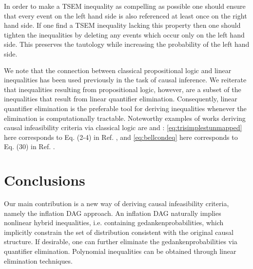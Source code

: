 In order to make a TSEM inequality as compelling as possible one should ensure that every event on the left hand side is also referenced at least once on the right hand side. If one find a TSEM inequality lacking this property then one should tighten the inequalities by deleting any events which occur only on the left hand side. This preserves the tautology while increasing the probability of the left hand side.

We note that the connection between classical propositional logic and linear inequalities has been used previously in the task of causal inference. We reiterate that inequalities resulting from propositional logic, however, are a subset of the inequalities that result from linear quantifier elimination. Consequently, linear quantifier elimination is the preferable tool for deriving inequalities whenever the elimination is computationally tractable. Noteworthy examples of works deriving causal infeasibility criteria via classical logic are \citet{Pitowsky1989} and \citet{Ghirardi08}: \cref{eq:trisimplestunmapped} here corresponds to Eq. (2-4) in Ref. \cite{Pitowsky1989}, and \cref{eq:bellcondeq} here corresponds to Eq. (30) in Ref. \cite{Ghirardi08}.






\section{Conclusions}

Our main contribution is a new way of deriving causal infeasibility criteria, namely the inflation DAG approach. An inflation DAG naturally implies nonlinear hybrid inequalities, i.e. containing gedankenprobabilities, which implicitly constrain the set of distribution consistent with the original causal structure. If desirable, one can further eliminate the gedankenprobabilities via quantifier elimination. Polynomial inequalities can be obtained through linear elimination techniques.

